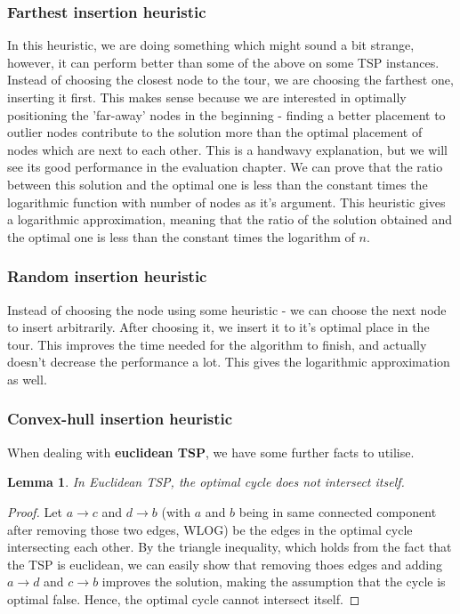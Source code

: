 \documentclass[12pt,twoside,notitlepage]{report}
\newtheorem{lemma}{Lemma}
\begin{document}
\subsubsection{Farthest insertion heuristic}

In this heuristic, we are doing something which might sound a bit strange, however, it can perform better than some of the above on some TSP instances. Instead of choosing the closest node to the tour, we are choosing the farthest one, inserting it first. This makes sense because we are interested in optimally positioning the 'far-away' nodes in the beginning - finding a better placement to outlier nodes contribute to the solution more than the optimal placement of nodes which are next to each other. This is a handwavy explanation, but we will see its good performance in the evaluation chapter. We can prove that the ratio between this solution and the optimal one is less than the constant times the logarithmic function with number of nodes as it's argument. This heuristic gives a logarithmic approximation, meaning that the ratio of the solution obtained and the optimal one is less than the constant times the logarithm of $n$.

\subsubsection{Random insertion heuristic}

Instead of choosing the node using some heuristic - we can choose the next node to insert arbitrarily. After choosing it, we insert it to it's optimal place in the tour. This improves the time needed for the algorithm to finish, and actually doesn't decrease the performance a lot. This gives the logarithmic approximation as well.

\subsubsection{Convex-hull insertion heuristic}

When dealing with {\bf euclidean TSP}, we have some further facts to utilise. 

\begin{lemma}

In Euclidean TSP, the optimal cycle does not intersect itself.

\end{lemma}

\begin{proof}

Let $a \rightarrow c$ and $d \rightarrow b$ (with $a$ and $b$ being in same connected component after removing those two edges, WLOG) be the edges in the optimal cycle intersecting each other. By the triangle inequality, which holds from the fact that the TSP is euclidean, we can easily show that removing thoes edges and adding $a \rightarrow d$ and $c \rightarrow b$ improves the solution, making the assumption that the cycle is optimal false. Hence, the optimal cycle cannot intersect itself. 

\end{proof}
\end{document}
